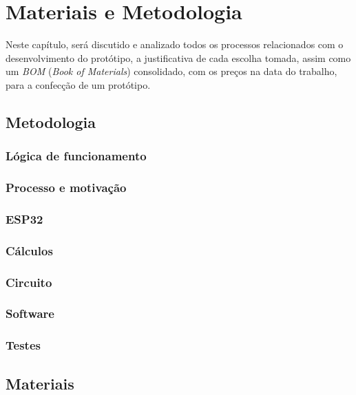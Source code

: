 
\chapter{Materiais e Metodologia}\label{cap:materialemetodos}

Neste capítulo, será discutido e analizado todos os processos relacionados com o desenvolvimento do protótipo, a justificativa de cada escolha tomada, assim como um \textit{\gls{BOM}} (\textit{Book of Materials}) consolidado, com os preços na data do trabalho, para a confecção de um protótipo.


\section{Metodologia}\label{sec:metodo}

\subsection{Lógica de funcionamento}\label{logic}
\subsection{Processo e motivação}\label{proccess}
\subsection{ESP32}\label{ESPw}
\subsection{Cálculos}\label{calc}
\subsection{Circuito}\label{circuit}
\subsection{Software}\label{softwar}
\subsection{Testes}\label{testesw}


\section{Materiais}\label{sec:materiais}

